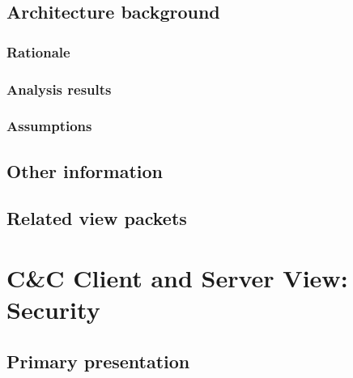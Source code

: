 \documentclass[a4paper,10pt]{book}
\begin{document}
\subsection{Architecture background}

\subsubsection{Rationale}

\subsubsection{Analysis results}

\subsubsection{Assumptions}

\subsection{Other information}

\subsection{Related view packets}


\section{C\&C Client and Server View: Security}
\label{Client and Server View: Security}

\subsection{Primary presentation}
\end{document}
